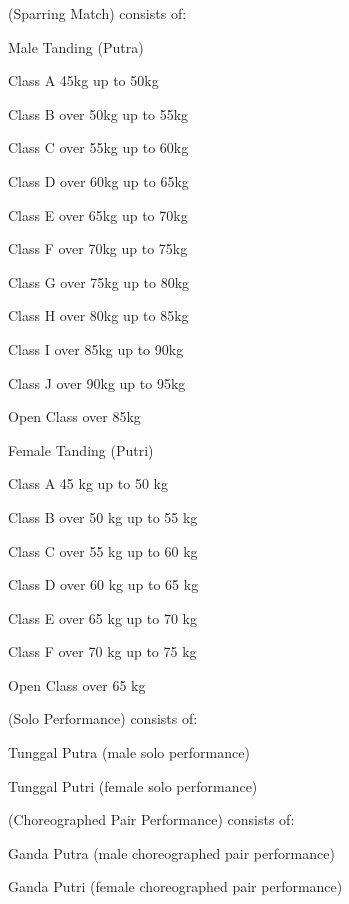 \begin{legal}
\item {} (Sparring Match) consists of:
    \begin{legal}
    \item Male Tanding (Putra)
        \begin{legal}
        \item Class A 45kg up to 50kg
        \item Class B over 50kg up to 55kg
        \item Class C over 55kg up to 60kg
        \item Class D over 60kg up to 65kg
        \item Class E over 65kg up to 70kg
        \item Class F over 70kg up to 75kg
        \item Class G over 75kg up to 80kg
        \item Class H over 80kg up to 85kg
        \item Class I over 85kg up to 90kg
        \item Class J over 90kg up to 95kg
        \item Open Class over 85kg
        \end{legal}
    \item Female Tanding (Putri)
        \begin{legal}
        \item Class A 45 kg up to 50 kg
        \item Class B over 50 kg up to 55 kg
        \item Class C over 55 kg up to 60 kg
        \item Class D over 60 kg up to 65 kg
        \item Class E over 65 kg up to 70 kg
        \item Class F over 70 kg up to 75 kg
        \item Open Class over 65 kg
        \end{legal}
    \item {} (Solo Performance) consists of:
        \begin{legal}
        \item Tunggal Putra (male solo performance)
        \item Tunggal Putri (female solo performance)
        \end{legal}

    \item {} (Choreographed Pair Performance) consists of:
        \begin{legal}
        \item Ganda Putra (male choreographed pair performance)
        \item Ganda Putri (female choreographed pair performance) 
        \end{legal}


\end{legal}
\end{legal}
